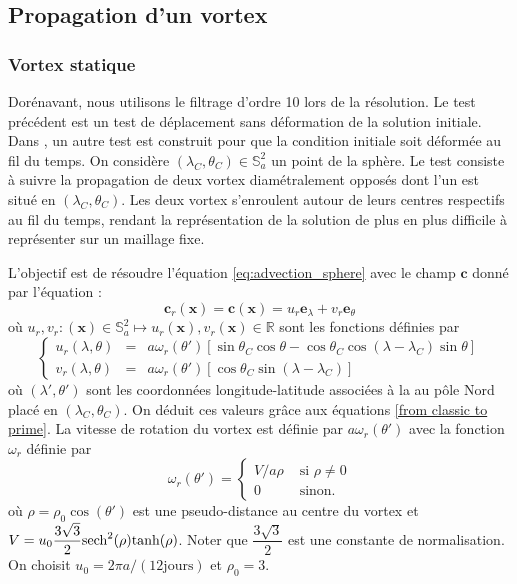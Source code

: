 \subsection{Propagation d'un vortex}

\subsubsection{Vortex statique}

Dorénavant, nous utilisons le filtrage d'ordre 10 lors de la résolution. Le test précédent est un test de déplacement sans déformation de la solution initiale. Dans \cite{Nair2002}, un autre test est construit pour que la condition initiale soit déformée au fil du temps.
On considère $(\lambda_C, \theta_C) \in \mathbb{S}_a^2$ un point de la sphère. Le test consiste à suivre la propagation de deux vortex diamétralement opposés dont l'un est situé en $(\lambda_C, \theta_C)$. Les deux vortex s'enroulent autour de leurs centres respectifs au fil du temps, rendant la représentation de la solution de plus en plus difficile à représenter sur un maillage fixe.

L'objectif est de résoudre l'équation \eqref{eq:advection_sphere} avec le champ $\mathbf{c}$ donné par l'équation :
\begin{equation}
\mathbf{c}_r(\mathbf{x}) = \mathbf{c}(\mathbf{x}) = u_r \mathbf{e}_{\lambda} + v_r \mathbf{e}_{\theta}
\label{eq:rotation_vortex}
\end{equation}
où $u_r, v_r : (\mathbf{x}) \in \mathbb{S}_a^2 \mapsto u_r(\mathbf{x}), v_r(\mathbf{x}) \in \mathbb{R}$ sont les fonctions définies par
\begin{equation}
\left\lbrace
\begin{array}{rcl}
u_r(\lambda, \theta) & = & a \omega_r(\theta') \left[ \sin \theta_C \cos \theta - \cos \theta_C \cos (\lambda - \lambda_C) \sin \theta \right] \\
v_r(\lambda, \theta) & = & a \omega_r (\theta') \left[\cos \theta_C \sin (\lambda - \lambda_C)  \right]
\end{array}
\right.
\end{equation}
où $(\lambda', \theta')$ sont les coordonnées longitude-latitude associées à la au pôle Nord placé en $(\lambda_C, \theta_C)$. On déduit ces valeurs grâce aux équations \eqref{from classic to prime}.
La vitesse de rotation du vortex est définie par $a \omega_r(\theta')$ avec la fonction $\omega_r$ définie par
\begin{equation}
\omega_r(\theta') = \left\lbrace
\begin{array}{cl}
V/a\rho & \text{ si } \rho \neq 0 \\
0 & \text{ sinon.}
\end{array}
\right.
\end{equation}
où $\rho = \rho_0 \cos (\theta')$ est une pseudo-distance au centre du vortex et $V=u_0 \dfrac{3 \sqrt{3}}{2} \text{sech}^2 (\rho) \text{tanh} (\rho)$. Noter que $\dfrac{3 \sqrt{3}}{2}$ est une constante de normalisation. On choisit $u_0 = 2 \pi a / (12 \text{jours})$ et $\rho_0 = 3$.

